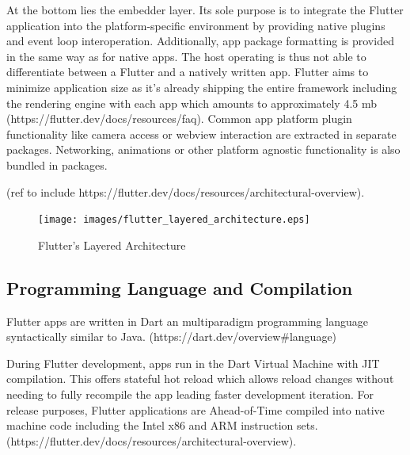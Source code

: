 At the bottom lies the embedder layer. Its sole purpose is to integrate the Flutter application into the platform-specific environment
by providing native plugins and event loop interoperation. 
Additionally, app package formatting is provided in the same way as for native apps. 
The host operating is thus not able to differentiate between a Flutter and a natively written app.
Flutter aims to minimize application size as it's already shipping the entire framework including the rendering engine with each app which amounts
to approximately 4.5 mb (https://flutter.dev/docs/resources/faq). Common app platform plugin functionality like camera access or webview 
interaction are extracted in separate packages. Networking, animations or other platform agnostic functionality is also bundled in packages. 

(ref to include https://flutter.dev/docs/resources/architectural-overview).
\begin{figure}
    \texttt{[image: images/flutter\_layered\_architecture.eps]}
    \caption{Flutter's Layered Architecture}
    \label{fig:flutter_layered_architecture}
\end{figure}


\subsection{Programming Language and Compilation}
Flutter apps are written in Dart an multiparadigm programming language syntactically similar to Java. (https://dart.dev/overview\#language)

During Flutter development, apps run in the Dart Virtual Machine with JIT compilation. This offers stateful hot reload which allows reload changes without needing 
to fully recompile the app leading faster development iteration.
For release purposes, Flutter applications are Ahead-of-Time compiled into native machine code including the Intel x86 and ARM instruction sets.
(https://flutter.dev/docs/resources/architectural-overview).



